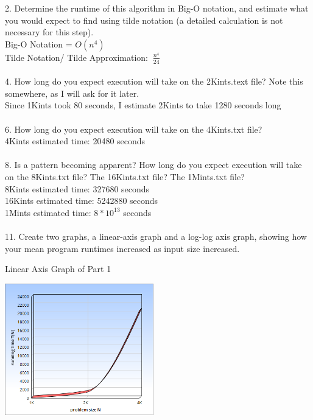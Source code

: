 \documentclass{article}
\begin{document}
2. Determine the runtime of this algorithm in Big-O notation, and estimate what you would expect to find using tilde notation (a detailed calculation is not necessary for this step).
\\
Big-O Notation = $O(n^4)$
\\
Tilde Notation/ Tilde Approximation: $~ \frac{n^4}{24}  $
\\
\\
4. How long do you expect execution will take on the 2Kints.text file? Note this somewhere, as I will ask for it later. 
\\
Since 1Kints took 80 seconds, I estimate 2Kints to take 1280 seconds long
\\
\\
6. How long do you expect execution will take on the 4Kints.txt file?
\\
4Kints estimated time: 20480 seconds
\\
\\
8. Is a pattern becoming apparent? How long do you expect execution will take on the 8Kints.txt file? The 16Kints.txt file? The 1Mints.txt file?
\\
8Kints estimated time: 327680 seconds
\\
16Kints estimated time: 5242880 seconds
\\
1Mints estimated time: $ 8 * 10^{13}$ seconds
\\
\\
11. Create two graphs, a linear-axis graph and a log-log axis graph, showing how your mean program runtimes increased as input size increased. 
\\
\newpage
\begin{center}
Linear Axis Graph of Part 1
\end{center}
\begin{center}
\includegraphics[width=6.45cm]{Part1Linear.png}
\end{center}
\end{document}
